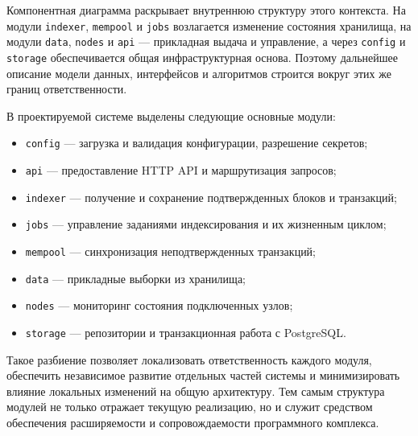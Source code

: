 Компонентная диаграмма раскрывает внутреннюю структуру этого контекста. На
модули \texttt{indexer}, \texttt{mempool} и \texttt{jobs} возлагается изменение
состояния хранилища, на модули \texttt{data}, \texttt{nodes} и \texttt{api} --- 
прикладная выдача и управление, а через \texttt{config} и \texttt{storage}
обеспечивается общая инфраструктурная основа. Поэтому дальнейшее описание модели
данных, интерфейсов и алгоритмов строится вокруг этих же границ ответственности.

В проектируемой системе выделены следующие основные модули:
\begin{itemize}
    \item \texttt{config} --- загрузка и валидация конфигурации, разрешение секретов;
    \item \texttt{api} --- предоставление HTTP API и маршрутизация запросов;
    \item \texttt{indexer} --- получение и сохранение подтвержденных блоков и транзакций;
    \item \texttt{jobs} --- управление заданиями индексирования и их жизненным циклом;
    \item \texttt{mempool} --- синхронизация неподтвержденных транзакций;
    \item \texttt{data} --- прикладные выборки из хранилища;
    \item \texttt{nodes} --- мониторинг состояния подключенных узлов;
    \item \texttt{storage} --- репозитории и транзакционная работа с PostgreSQL.
\end{itemize}

Такое разбиение позволяет локализовать ответственность каждого модуля,
обеспечить независимое развитие отдельных частей системы и минимизировать
влияние локальных изменений на общую архитектуру. Тем самым структура модулей
не только отражает текущую реализацию, но и служит средством обеспечения
расширяемости и сопровождаемости программного комплекса.
